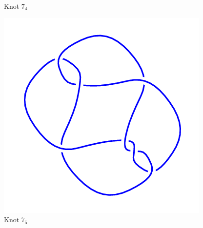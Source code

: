 \documentclass{article}
\begin{document}
\begin{figure}[!htb]
\caption{Knot $7_4$}
\endminipage\hfill
{}
\includegraphics[width=\linewidth]{7_5.png}
\caption{Knot $7_5$}
\endminipage\hfill
\end{figure}
\end{document}
